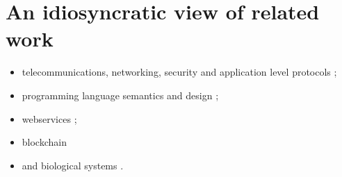 \section{An idiosyncratic view of related work}

\begin{itemize}
\item telecommunications, networking, security and application level protocols
\cite{DBLP:conf/popl/AbadiB02} 
\cite{DBLP:journals/tcs/AbadiB03} 
\cite{DBLP:conf/epew/BrownLM05} 
\cite{DBLP:conf/fossacs/LaneveZ05}; 
\item programming language semantics and design
\cite{DBLP:conf/epew/BrownLM05}
\cite{djoin}
\cite{DBLP:conf/afp/FournetFMS02}
\cite{DBLP:journals/toplas/SewellWU10};
\item webservices
\cite{DBLP:conf/epew/BrownLM05}
\cite{DBLP:conf/fossacs/LaneveZ05}
\cite{DBLP:conf/wise/Meredith03};
\item{blockchain}
  \cite{meredith_2017}
\item and biological systems
\cite{DBLP:conf/cmsb/Cardelli04}
\cite{DBLP:conf/esop/DanosL03}
\cite{DBLP:conf/psb/RegevSS01}
\cite{DBLP:journals/ipl/PriamiRSS01}.
\end{itemize}


